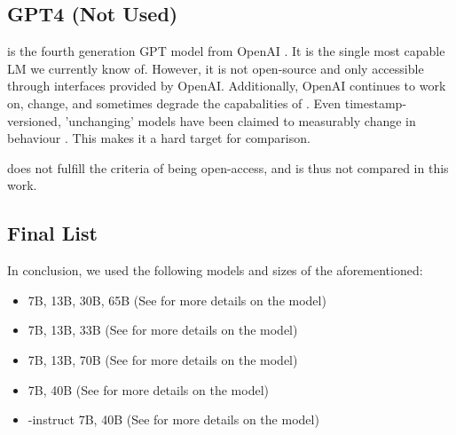 \subsection{GPT4 (Not Used)}\label{sub:GPT4}
 is the fourth generation \gls{GPT} model from \gls{OpenAI} \cite{openai_gpt4_2023}.
It is the single most capable \acrlong{LM} we currently know of.
However, it is not open-source and only accessible through interfaces provided by \gls{OpenAI}.
Additionally, \gls{OpenAI} continues to work on, change, and sometimes degrade the capabalities of  \cite{chen_how_2023}.
Even timestamp-versioned, 'unchanging' models have been claimed to measurably change in behaviour \cite{jw1224_hn}.
This makes it a hard target for comparison.

 does not fulfill the criteria of being open-access, and is thus not compared in this work.


\subsection{Final List}\label{sub:list}
In conclusion, we used the following models and sizes of the aforementioned:
\begin{itemize}
    \item {} 7B, 13B, 30B, 65B (See  for more details on the model)
    \item {} 7B, 13B, 33B (See  for more details on the model)
    \item {} 7B, 13B, 70B (See  for more details on the model)
    \item {} 7B, 40B (See  for more details on the model)
    \item {}-instruct 7B, 40B (See  for more details on the model)
\end{itemize}
